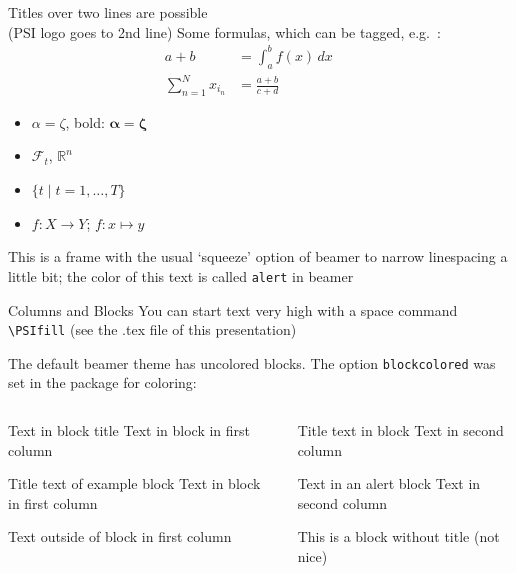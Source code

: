 \documentclass[aspectratio=169]{beamer}
\begin{document}
\begin{frame}[squeeze]{Titles over two lines are possible\\
    (PSI logo goes to 2nd line)}
  Some formulas, which can be tagged, e.g.\ \thetag{$\ast$}:
  \begin{align*}
    a + b  & = \int_a^b f(x)\,dx             && \tag{$\ast$}\\
    \sum_{n=1}^N x_{i_n} &= \frac{a+b}{c+d}  &&
  \end{align*}
  \begin{itemize}
  \item  $\alpha = \zeta$, bold: $\boldsymbol{\alpha} = \boldsymbol{\zeta}$ 
  \item $\mathcal{F}_t$, $\mathbb{R}^n$
  \item $\{t \mid t=1,\dots,T\}$
  \item $f\colon X\to Y$; $f\colon x\mapsto y$
  \end{itemize}
   \alert{This is a frame with the usual `squeeze' option of beamer to narrow linespacing a little bit; the color of this text is called \texttt{alert} in beamer}
  
\end{frame}

\begin{frame}{Columns and Blocks}
  You can start text very high with a space command \texttt{\textbackslash PSIfill} (see the .tex file of this presentation)

 The default beamer theme has uncolored blocks. The option \texttt{blockcolored} was set in the package for coloring: 
  \begin{columns}
    \begin{column}[T]{0.6\linewidth}
      \begin{block}{Text in block title}
        Text in block in first column
      \end{block}
      \begin{exampleblock}{Title text of example block}
        Text in block in first column
      \end{exampleblock}
      Text outside of block in first column
    \end{column}
    \begin{column}[T]{0.4\linewidth}
      \begin{block}{Title text in block}
        Text in second column 
      \end{block}
      \begin{alertblock}{Text in an alert block}
        Text in second column
      \end{alertblock}
      \begin{block}{}
        This is a block without title (not nice)
      \end{block}
    \end{column}
  \end{columns}
    
    \PSIfill
 \end{frame}
 
\end{document}
